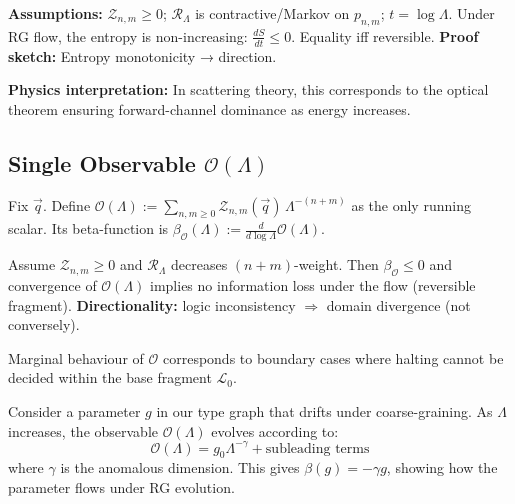 \begin{proposition}
\label{thm:entropy-monotonicity}
\textbf{Assumptions:} $\mathcal{Z}_{n,m}\ge0$; $\mathcal{R}_\Lambda$ is contractive/Markov on $p_{n,m}$; $t=\log\Lambda$.
Under RG flow, the entropy is non-increasing: $\frac{dS}{dt} \leq 0$. Equality iff reversible.
\textbf{Proof sketch:} Entropy monotonicity → direction.

\textbf{Physics interpretation:} In scattering theory, this corresponds to the optical theorem ensuring forward-channel dominance as energy increases.
\end{proposition}

\subsection{Single Observable $\mathcal{O}(\Lambda)$}

Fix $\vec{q}$. Define $\mathcal{O}(\Lambda):=\sum_{n,m\ge0}\mathcal{Z}_{n,m}(\vec{q})\,\Lambda^{-(n+m)}$ as the only running scalar. Its beta-function is $\beta_\mathcal{O}(\Lambda):=\frac{d}{d\log\Lambda}\mathcal{O}(\Lambda)$.

\begin{proposition}
\label{prop:rg-corresp}
Assume $\mathcal{Z}_{n,m}\ge0$ and $\mathcal{R}_\Lambda$ decreases $(n+m)$-weight.
Then $\beta_\mathcal{O}\le0$ and convergence of $\mathcal{O}(\Lambda)$ implies
no information loss under the flow (reversible fragment). \textbf{Directionality:} logic inconsistency $\Rightarrow$ domain divergence (not conversely).
\end{proposition}

\begin{conjecture}
\label{conj:marginal}
Marginal behaviour of $\mathcal{O}$ corresponds to boundary cases where halting cannot
be decided within the base fragment $\mathcal{L}_0$.
\end{conjecture}

\begin{example}
\label{ex:synthetic-rg-flow}
Consider a parameter $g$ in our type graph that drifts under coarse-graining. As $\Lambda$ increases, the observable $\mathcal{O}(\Lambda)$ evolves according to:
\[
\mathcal{O}(\Lambda) = g_0 \Lambda^{-\gamma} + \text{subleading terms}
\]
where $\gamma$ is the anomalous dimension. This gives $\beta(g) = -\gamma g$, showing how the parameter flows under RG evolution.
\end{example}

